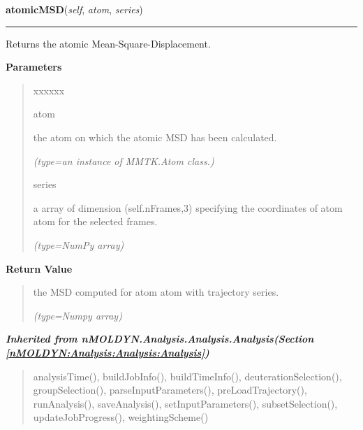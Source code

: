 \hspace{.8\funcindent}\begin{boxedminipage}{\funcwidth}

    \raggedright \textbf{atomicMSD}(\textit{self}, \textit{atom}, \textit{series})

    \vspace{-1.5ex}

    \rule{\textwidth}{0.5\fboxrule}
\setlength{\parskip}{2ex}
    Returns the atomic Mean-Square-Displacement.

\setlength{\parskip}{1ex}
      \textbf{Parameters}
      \vspace{-1ex}

      \begin{quote}
        \begin{Ventry}{xxxxxx}

          \item[atom]

          the atom on which the atomic MSD has been calculated.

            {\it (type=an instance of MMTK.Atom class.)}

          \item[series]

          a array of dimension (self.nFrames,3) specifying the coordinates 
          of atom {\textbar}atom{\textbar} for the selected frames.

            {\it (type=NumPy array)}

        \end{Ventry}

      \end{quote}

      \textbf{Return Value}
    \vspace{-1ex}

      \begin{quote}
      the MSD computed for atom {\textbar}atom{\textbar} with trajectory 
      {\textbar}series{\textbar}.

      {\it (type=Numpy array)}

      \end{quote}

    \end{boxedminipage}


\large{\textbf{\textit{Inherited from nMOLDYN.Analysis.Analysis.Analysis\textit{(Section \ref{nMOLDYN:Analysis:Analysis:Analysis})}}}}

\begin{quote}
analysisTime(), buildJobInfo(), buildTimeInfo(), deuterationSelection(), groupSelection(), parseInputParameters(), preLoadTrajectory(), runAnalysis(), saveAnalysis(), setInputParameters(), subsetSelection(), updateJobProgress(), weightingScheme()
\end{quote}

